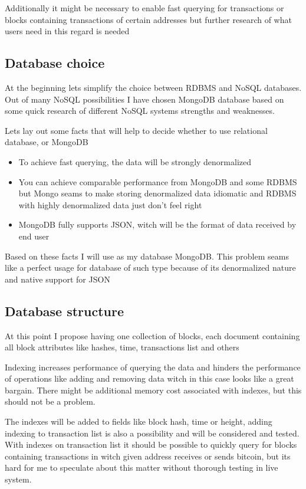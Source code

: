 \documentclass{article}
\begin{document}
Additionally it might be necessary to enable fast querying for transactions or blocks containing transactions of certain addresses but further research of what users need in this regard is needed

\subsection{Database choice}
At the beginning lets simplify the choice between RDBMS and NoSQL databases. Out of many NoSQL possibilities I have chosen MongoDB database based on some quick research of different NoSQL systems strengths and weaknesses.

Lets lay out some facts that will help to decide whether to use relational database, or MongoDB

\begin{itemize}
\item 
To achieve fast querying, the data will be strongly denormalized
\item 
You can achieve comparable performance from MongoDB and some RDBMS but Mongo seams to make storing denormalized data idiomatic and RDBMS with highly denormalized data just don't feel right
\item MongoDB fully supports JSON, witch will be the format of data received by end user
\end{itemize}

Based on these facts I will use as my database MongoDB. This problem seams like a perfect usage for database of such type because of its denormalized nature and native support for JSON
 \subsection{Database structure}
 
 At this point I propose having one collection of blocks, each document containing all block attributes like hashes, time, transactions list and others
 
Indexing increases performance of querying the data and hinders the performance of operations like adding and removing data witch in this case looks like a great bargain. There might be additional memory cost associated with indexes, but this should not be a problem.

The indexes will be added to fields like block hash, time or height, adding indexing to transaction list is also a possibility and will be considered and tested. With indexes on transaction list it should be possible to quickly query for blocks containing transactions in witch given address receives or sends bitcoin, but its hard for me to speculate about this matter without thorough testing in live system.
\end{document}
